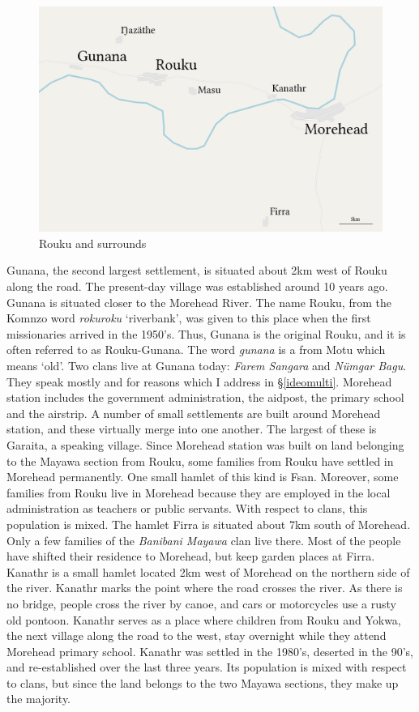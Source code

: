 \begin{figure}
    \includegraphics[width=.9\textwidth]{figures/map2.png}
  \caption[Rouku]{Rouku and surrounds}
  \label{fig:map2}
\end{figure}

Gunana, the second largest settlement, is situated about 2km west of Rouku along the road. The present-day village was established around 10 years ago. Gunana is situated closer to the Morehead River. The name Rouku, from the Komnzo word \emph{rokuroku} `riverbank', was given to this place when the first missionaries arrived in the 1950's. Thus, Gunana is the original Rouku, and it is often referred to as Rouku-Gunana. The word \emph{gunana} is a  from Motu which means `old'. Two clans live at Gunana today: \emph{Farem Sangara} and \emph{Nümgar Bagu}. They speak mostly  and  for reasons which I address in \S{}\ref{ideomulti}. Morehead station includes the government administration, the aidpost, the primary school and the airstrip. A number of small settlements are built around Morehead station, and these virtually merge into one another. The largest of these is Garaita, a  speaking village. Since Morehead station was built on land belonging to the Mayawa section from Rouku, some families from Rouku have settled in Morehead permanently. One small hamlet of this kind is Fsan. Moreover, some families from Rouku live in Morehead because they are employed in the local administration as teachers or public servants. With respect to clans, this population is mixed. The hamlet Firra is situated about 7km south of Morehead. Only a few families of the \emph{Banibani Mayawa} clan live there. Most of the people have shifted their residence to Morehead, but keep garden places at Firra. Kanathr is a small hamlet located 2km west of Morehead on the northern side of the river. Kanathr marks the point where the road crosses the river. As there is no bridge, people cross the river by canoe, and cars or motorcycles use a rusty old pontoon. Kanathr serves as a place where children from Rouku and Yokwa, the next village along the road to the west, stay overnight while they attend Morehead primary school. Kanathr was settled in the 1980's, deserted in the 90's, and re-established over the last three years. Its population is mixed with respect to clans, but since the land belongs to the two Mayawa sections, they make up the majority.%

